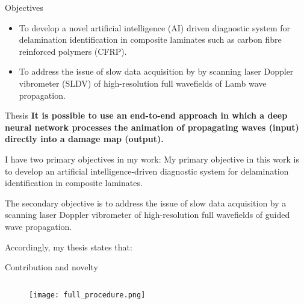 \documentclass[10pt,aspectratio=169,dvipsnames]{beamer} %
\begin{document}
	\begin{frame}{Objectives}
			\justifying
			\begin{itemize}
				\item {To develop \textcolor{logoblue}{a novel artificial intelligence (AI) driven diagnostic system} for delamination identification in composite laminates such as carbon fibre reinforced polymers (CFRP).}
				\item {To address the issue of \textcolor{logoblue}{slow data acquisition} by by scanning laser Doppler vibrometer (SLDV) of high-resolution full wavefields of Lamb wave propagation.}
			\end{itemize}
		\begin{tcolorbox}			
			\begin{alertblock}{Thesis}
				\justifying
				\textbf{It is possible to use an end-to-end approach in which a deep neural network	processes the animation of propagating waves (input) directly into a damage map (output).}
			\end{alertblock}
		\end{tcolorbox}		
	\end{frame}
	\note
	{
		I have two primary objectives in my work:
		My primary objective in this work is to develop an artificial intelligence-driven diagnostic system for delamination identification in composite laminates.
		
		The secondary objective is to address the issue of slow data acquisition by a scanning laser Doppler vibrometer of high-resolution full wavefields of guided wave propagation.
		
		Accordingly, my thesis states that:
	}
	\begin{frame}{Contribution and novelty}
		\begin{columns}[T]
			\begin{column}[c]{0.9\textwidth}
				\begin{figure}
					\centering
					\texttt{[image: full\_procedure.png]}	
				\end{figure}		
			\end{column}
		\end{columns}		
	\end{frame}
\end{document}
